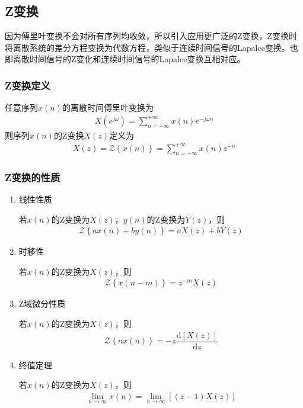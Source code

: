 \documentclass{hitreport}
\begin{document}
\subsection{Z变换}

因为傅里叶变换不会对所有序列均收敛，所以引入应用更广泛的Z变换，Z变换时将离散系统的差分方程变换为代数方程，类似于连续时间信号的Lapalce变换。也即离散时间信号的Z变化和连续时间信号的Lapalce变换互相对应。

\subsubsection{Z变换定义}

任意序列$x\left(n\right)$的离散时间傅里叶变换为
\begin{align}
X\left(e^{j\omega}\right) = \sum\limits_{n=-\infty}^{+\infty}{x\left(n\right)e^{-j\omega n}}
\end{align}
则序列$x\left(n\right)$的Z变换$X\left(z\right)$定义为
\begin{align}
X\left(z\right) = \mathscr{Z}\left\{x\left(n\right)\right\}=\sum\limits_{n=-\infty}^{+\infty}x\left(n\right)z^{-n}
\end{align}

\subsubsection{Z变换的性质}

\begin{enumerate}
\item 线性性质

若$x\left(n\right)$的Z变换为$X\left(z\right)$，$y\left(n\right)$的Z变换为$Y\left(z\right)$，则
\begin{align}
\mathscr{Z}\left\{ax\left(n\right)+by\left(n\right)\right\} = aX\left(z\right)+bY\left(z\right)
\end{align}

\item 时移性

若$x\left(n\right)$的Z变换为$X\left(z\right)$，则
\begin{align}
\mathscr{Z}\left\{x\left(n-m\right)\right\} = z^{-m}X\left(z\right)
\end{align}

\item Z域微分性质

若$x\left(n\right)$的Z变换为$X\left(z\right)$，则
\begin{align}
\mathscr{Z}\left\{nx\left(n\right)\right\} = -z\dfrac{\mathrm{d}\left[X\left(z\right)\right]}{\mathrm{d}z}
\end{align}

\item 终值定理

若$x\left(n\right)$的Z变换为$X\left(z\right)$，则
\begin{align}
\underset{n\rightarrow \infty}{\lim}x\left(n\right) = \underset{n\rightarrow \infty}{\lim}\left[\left(z-1\right)X\left(z\right)\right]
\end{align}
\end{enumerate}
\end{document}
